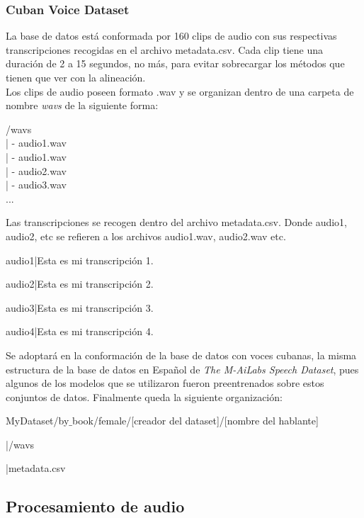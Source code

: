 \subsubsection{Cuban Voice Dataset}
La base de datos está conformada por 160 clips de audio con sus respectivas transcripciones recogidas en el archivo metadata.csv. Cada clip tiene una duración de 2 a 15 segundos, no más, para evitar sobrecargar los métodos que tienen que ver con la alineación.\\

Los clips de audio poseen formato .wav y se organizan dentro de una carpeta de nombre \textit{wavs} de la siguiente forma:

\begin{center}
	/wavs\\
	| - audio1.wav\\
	| - audio1.wav\\
	| - audio2.wav\\
	| - audio3.wav\\
	...
\end{center}

Las transcripciones se recogen dentro del archivo metadata.csv. Donde audio1, audio2, etc se refieren a los archivos audio1.wav, audio2.wav etc.

\begin{center}
	audio1|Esta es mi transcripción 1.
	
	audio2|Esta es mi transcripción 2.
	
	audio3|Esta es mi transcripción 3.
	
	audio4|Esta es mi transcripción 4.
\end{center}

 Se adoptará en la conformación de la base de datos con voces cubanas, la misma estructura de la base de datos en Español de \textit{The M-AiLabs Speech Dataset}, pues algunos de los modelos que se utilizaron fueron preentrenados sobre estos conjuntos de datos. Finalmente queda la siguiente organización:
 
\begin{flushleft}
	MyDataset/by$\_$book/female/[creador del dataset]/[nombre del hablante]
	
	|/wavs
	
	|metadata.csv
\end{flushleft}






\subsection{Procesamiento de audio}

